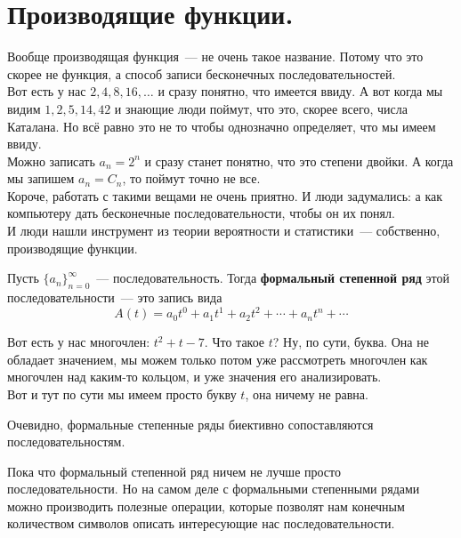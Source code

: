 \documentclass{article}
\begin{document}
    \tableofcontents
    \section{Производящие функции.}
    \begin{remark}
        Вообще производящая функция~--- не очень такое название. Потому что это скорее не функция, а способ записи бесконечных последовательностей.\\
        Вот есть у нас $2,4,8,16,\ldots$ и сразу понятно, что имеется ввиду. А вот когда мы видим $1,2,5,14,42$ и знающие люди поймут, что это, скорее всего, числа Каталана. Но всё равно это не то чтобы однозначно определяет, что мы имеем ввиду.\\
        Можно записать $a_n=2^n$ и сразу станет понятно, что это степени двойки. А когда мы запишем $a_n=C_n$, то поймут точно не все.\\
        Короче, работать с такими вещами не очень приятно. И люди задумались: а как компьютеру дать бесконечные последовательности, чтобы он их понял.\\
        И люди нашли инструмент из теории вероятности и статистики~--- собственно, производящие функции.
    \end{remark}
    \begin{definition}
        Пусть $\{a_n\}_{n=0}^\infty$~--- последовательность. Тогда \textbf{формальный степенной ряд} этой последовательности~--- это запись вида
        $$
        A(t)=a_0t^0+a_1t^1+a_2t^2+\cdots+a_nt^n+\cdots
        $$
    \end{definition}
    \begin{remark}
        Вот есть у нас многочлен: $t^2+t-7$. Что такое $t$? Ну, по сути, буква. Она не обладает значением, мы можем только потом уже рассмотреть многочлен как многочлен над каким-то кольцом, и уже значения его анализировать.\\
        Вот и тут по сути мы имеем просто букву $t$, она ничему не равна.
    \end{remark}
    \begin{claim}
        Очевидно, формальные степенные ряды биективно сопоставляются последовательностям.
    \end{claim}
    \begin{remark}
        Пока что формальный степенной ряд ничем не лучше просто последовательности. Но на самом деле с формальными степенными рядами можно производить полезные операции, которые позволят нам конечным количеством символов описать интересующие нас последовательности.
    \end{remark}
\end{document}
